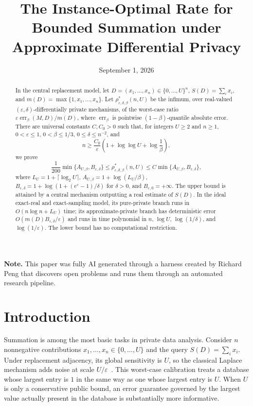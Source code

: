 \documentclass[11pt]{article}
\title{The Instance-Optimal Rate for Bounded Summation under Approximate Differential Privacy}
\author{}
\date{September 1, 2026}
\begin{document}

\maketitle

\begin{abstract}
In the central replacement model, let
$D=(x_1,\ldots,x_n)\in\{0,\ldots,U\}^n$,
$S(D)=\sum_i x_i$, and $m(D)=\max\{1,x_1,\ldots,x_n\}$.  Let
$\rho^*_{\varepsilon,\delta,\beta}(n,U)$ be the infimum, over real-valued
$(\varepsilon,\delta)$-differentially private mechanisms, of the worst-case
ratio $\varepsilon\operatorname{err}_{\beta}(M,D)/m(D)$, where
$\operatorname{err}_{\beta}$ is pointwise $(1-\beta)$-quantile absolute
error.  There are universal constants $C,C_0>0$ such that, for integers
$U\ge2$ and $n\ge1$, $0<\varepsilon\le1$, $0<\beta\le1/3$,
$0\le\delta\le n^{-2}$, and
\[
 n\ge \frac{C_0}{\varepsilon}
 \left(1+\log\log U+\log\frac1\beta\right),
\]
we prove
\[
 \frac1{200}\min\{A_{U,\beta},B_{\varepsilon,\delta}\}
 \le \rho^*_{\varepsilon,\delta,\beta}(n,U)
 \le C\min\{A_{U,\beta},B_{\varepsilon,\delta}\},
\]
where $L_U=1+\lceil\log_2U\rceil$,
$A_{U,\beta}=1+\log(L_U/\beta)$,
$B_{\varepsilon,\delta}=1+\log(1+(e^\varepsilon-1)/\delta)$ for
$\delta>0$, and $B_{\varepsilon,0}=+\infty$.  The upper bound is attained by
a central mechanism outputting a real estimate of $S(D)$.  In the ideal
exact-real and exact-sampling model, its pure-private branch runs in
$O(n\log n+L_U)$ time; its approximate-private branch has deterministic
error $O(m(D)B_{\varepsilon,\delta}/\varepsilon)$ and runs in time polynomial
in $n$, $\log U$, $\log(1/\delta)$, and $\log(1/\varepsilon)$.  The lower
bound has no computational restriction.
\end{abstract}

\noindent\textbf{Note.} This paper was fully AI generated through a harness created by Richard Peng that discovers open problems and runs them through an automated research pipeline.

\clearpage
\tableofcontents
\clearpage


\section{Introduction}
\label{sec:introduction}

Summation is among the most basic tasks in private data analysis.  Consider
$n$ nonnegative contributions $x_1,\ldots,x_n\in\{0,\ldots,U\}$ and the
query $S(D)=\sum_i x_i$.  Under replacement adjacency, its global
sensitivity is $U$, so the classical Laplace mechanism adds noise at scale
$U/\varepsilon$~\cite{DworkMcSherryNissimSmith2006Calibrating}.  This
worst-case calibration treats a database whose largest entry is $1$ in the
same way as one whose largest entry is $U$.  When $U$ is only a conservative
public bound, an error guarantee governed by the largest value actually
present in the database is substantially more informative.
\end{document}
